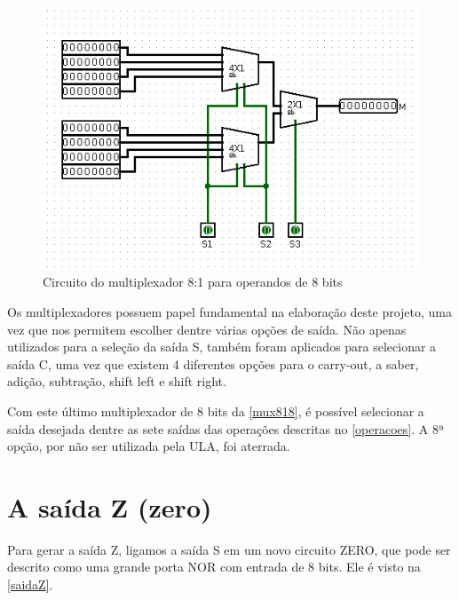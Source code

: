 \documentclass[
	12pt,				%
	openright,			%
	twoside,			%
	a4paper,			%
	english,			%
	french,				%
	spanish,			%
	brazil,				%
	]{abntex2}
\begin{document}
\begin{figure}[H]
	\begin{center}
	    \includegraphics[scale=0.7]{imagens/mux818.png}
	\end{center}
\caption{\label{mux818}Circuito do multiplexador 8:1 para operandos de 8 bits}
\end{figure}

Os multiplexadores possuem papel fundamental na elaboração deste projeto, uma vez que nos permitem escolher dentre várias opções de saída. Não apenas utilizados para a seleção da saída S, também foram aplicados para selecionar a saída C, uma vez que existem 4 diferentes opções para o carry-out, a saber, adição, subtração, shift left e shift right.

Com este último multiplexador de 8 bits da \autoref{mux818}, é possível selecionar a saída desejada dentre as sete saídas das operações descritas no \autoref{operacoes}. A 8ª opção, por não ser utilizada pela ULA, foi aterrada.

\section{A saída Z (zero)}

Para gerar a saída Z, ligamos a saída S em um novo circuito ZERO, que pode ser descrito como uma grande porta NOR com entrada de 8 bits. Ele é visto na \autoref{saidaZ}.
\end{document}
